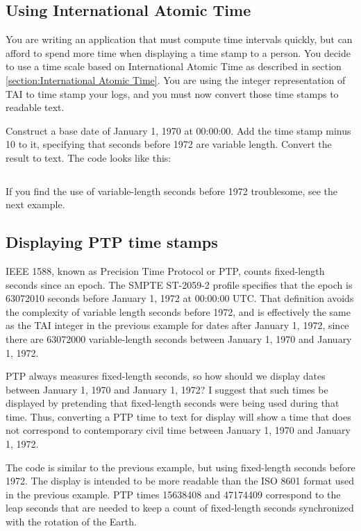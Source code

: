 \documentclass[letterpaper,twoside]{article}
\begin{document}
\subsection{Using International Atomic Time}
\label{example:TAI}
You are writing an application that must compute time intervals quickly,
but can afford to spend more time when displaying a time stamp to a person.
You decide to use a time scale based on International Atomic Time as described
in section \ref{section:International Atomic Time}.  You are using the
integer representation of TAI to time stamp your logs, and you must now convert
those time stamps to readable text.

Construct a base date of January 1, 1970 at 00:00:00.  Add the time stamp
minus 10 to it, specifying that seconds before 1972 are variable length.
Convert the result to text.  The code looks like this:
\inputminted[firstline=41,lastline=67]{c}{examples/example_04.c}

If you find the use of variable-length seconds before 1972 troublesome,
see the next example.

\subsection{Displaying PTP time stamps}
\label{example:PTP}
IEEE 1588, known as Precision Time Protocol or PTP, counts fixed-length
seconds since an epoch.
The SMPTE ST-2059-2 profile specifies that the epoch is
\num{63072010} seconds before January 1, 1972 at 00:00:00 UTC.  That definition
avoids the complexity of variable length seconds before 1972, and is
effectively the same as the TAI integer in the previous example
for dates after January 1, 1972, since there are \num{63072000}
variable-length seconds between January 1, 1970 and January 1, 1972.

PTP always measures fixed-length seconds, so how should we display
dates between January 1, 1970 and January 1, 1972?  I suggest that
such times be displayed by pretending that fixed-length seconds
were being used during that time.  Thus, converting a PTP time
to text for display will show a time that does not correspond to
contemporary civil time between January 1, 1970 and January 1, 1972.

The code is similar to the previous example, but using
fixed-length seconds before 1972.  The display is intended to be
more readable than the ISO 8601 format used in the previous example.
PTP times \num{15638408} and \num{47174409} correspond to the leap
seconds that are needed to keep a count of fixed-length seconds
synchronized with the rotation of the Earth.
\end{document}
